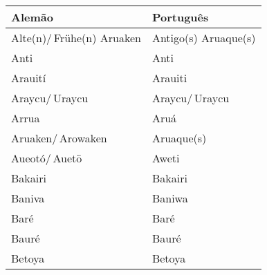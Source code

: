 
\begin{center}
\begin{tabular}{ | m{11em} | m{4.2cm}| } 
\hline
\textbf{Alemão} & \textbf{Português} \\ [0.5ex] 
\hline\hline
Alte(n)/\,Frühe(n) Aruaken & Antigo(s) Aruaque(s) \\
\hline
Anti 						& Anti \\
\hline
Arauití 					& Arauiti \\
\hline
Araycu/\,Uraycu              & Araycu/\,Uraycu  \\
\hline
Arrua           	  	       	  & Aruá \\
\hline
Aruaken/\,Arowaken 	       	  & Aruaque(s) \\
\hline
Aueotó/\,Auetö    	       	  & Aweti \\
\hline
Bakairi           	       	  & Bakairi \\
\hline
Baniva            	       	  & Baniwa \\
\hline
Baré              	       	  & Baré \\
\hline
Bauré             	       	  & Bauré \\
\hline
Betoya            	       	  & Betoya \\
\hline
\end{tabular}
\end{center}

\pagebreak



